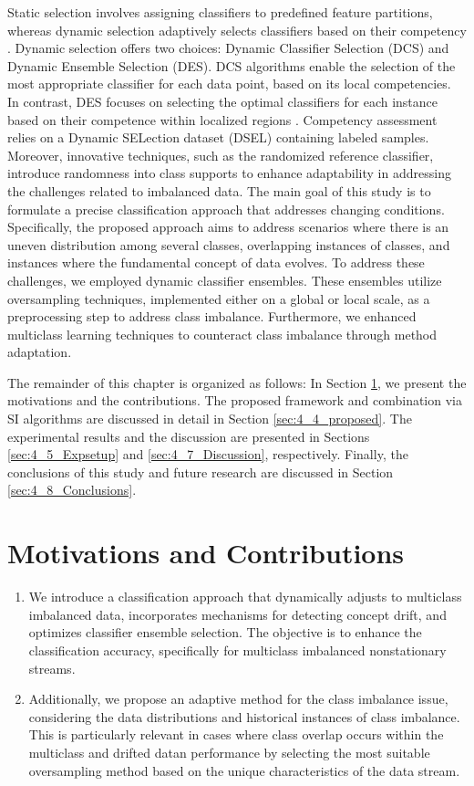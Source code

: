 Static selection involves assigning classifiers to predefined feature partitions, whereas dynamic selection adaptively selects classifiers
based on their competency \cite{lysiak2014optimal}. Dynamic selection offers two choices: Dynamic Classifier Selection (DCS) and Dynamic Ensemble
Selection (DES). DCS algorithms enable the selection of the most appropriate classifier for each data point, based on its local competencies. In contrast, DES focuses on selecting the optimal classifiers for each instance based on their competence within localized
regions \cite{cruz2017meta}\cite{widmer1996learning}\cite{lu2016concept}. Competency assessment relies on a Dynamic SELection dataset (DSEL) containing labeled samples. Moreover,
innovative techniques, such as the randomized reference classifier, introduce randomness into class supports to enhance adaptability
in addressing the challenges related to imbalanced data.
The main goal of this study is to formulate a precise classification approach that addresses changing conditions. Specifically, the
proposed approach aims to address scenarios where there is an uneven distribution among several classes, overlapping instances of
classes, and instances where the fundamental concept of data evolves. To address these challenges, we employed dynamic classifier
ensembles. These ensembles utilize oversampling techniques, implemented either on a global or local scale, as a preprocessing step to
address class imbalance. Furthermore, we enhanced multiclass learning techniques to counteract class imbalance through method
adaptation. 

The remainder of this chapter is organized as follows: In Section \ref{sec:4_2_motivation}, we present the motivations and the contributions. The proposed framework and combination via SI algorithms are discussed in detail in Section \ref{sec:4_4_proposed}. The  experimental results and the discussion are presented in Sections \ref{sec:4_5_Expsetup} and \ref{sec:4_7_Discussion}, respectively. Finally, the conclusions of this study and future research are discussed in Section \ref{sec:4_8_Conclusions}. 


\section{Motivations and Contributions} \label{sec:4_2_motivation}
\begin{enumerate}[nosep]
  \item We introduce a classification approach that dynamically adjusts to multiclass imbalanced data, incorporates mechanisms for
  detecting concept drift, and optimizes classifier ensemble selection. The objective is to enhance the classification accuracy, specifically for multiclass imbalanced nonstationary streams.
 \item Additionally, we propose an adaptive method for the class imbalance issue, considering the data distributions and historical instances of class imbalance. This is particularly relevant in cases where class overlap occurs within the multiclass and drifted datan performance by selecting the most suitable oversampling method based on the unique characteristics of the data stream. 
  \end{enumerate} 
 
   

